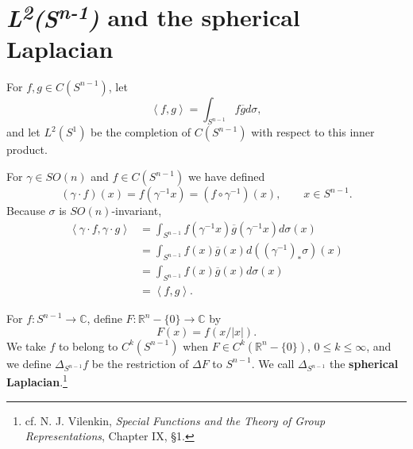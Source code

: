 \documentclass{article}
\newcommand{\inner}[2]{\left\langle #1, #2 \right\rangle}
\theoremstyle{definition}
\theoremstyle{definition}
\begin{document}
\section{{\em L\textsuperscript{2}(S\textsuperscript{n-1})} and the spherical Laplacian}
For $f,g \in C(S^{n-1})$, let
\[
\inner{f}{g}= \int_{S^{n-1}} f \overline{g} d\sigma,
\]
and let $L^2(S^1)$ be the completion of $C(S^{n-1})$ with respect to this inner product.

For $\gamma \in SO(n)$ and $f \in C(S^{n-1})$ we have defined
\[
(\gamma \cdot f)(x) = f(\gamma^{-1} x)=(f \circ \gamma^{-1})(x),\qquad x \in S^{n-1}.
\]
Because $\sigma$ is $SO(n)$-invariant,
\begin{align*}
\inner{\gamma \cdot f}{\gamma\cdot g}&=\int_{S^{n-1}} f(\gamma^{-1}x) \overline{g}(\gamma^{-1}x) d\sigma(x)\\
&=\int_{S^{n-1}} f(x) \overline{g}(x) d((\gamma^{-1})_* \sigma)(x)\\
&=\int_{S^{n-1}} f(x) \overline{g}(x) d\sigma(x)\\
&=\inner{f}{g}.
\end{align*}


For $f:S^{n-1} \to \mathbb{C}$, define $F:\mathbb{R}^n - \{0\} \to \mathbb{C}$ by
\[
F(x) = f(x/|x|).
\]
We take $f$ to belong to $C^k(S^{n-1})$ when $F \in C^k(\mathbb{R}^n - \{0\})$, $0 \leq k \leq \infty$, and
we define
$\Delta_{S^{n-1}} f$ be the restriction of $\Delta F$ to $S^{n-1}$.  We call $\Delta_{S^{n-1}}$ the \textbf{spherical
Laplacian}.\footnote{cf. N. J. Vilenkin, {\em Special Functions and the Theory of Group
Representations}, Chapter IX, \S 1.}
\end{document}
